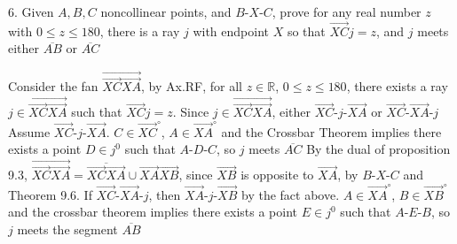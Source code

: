 \documentclass{report}
\begin{document}
    \bigbreak \noindent 
    \begin{mdframed}
        6. Given $A,B,C$ noncollinear points, and $ B\text{-}X\text{-}C$, prove for any real number $z$ with $0 \leq z \leq 180$, there is a ray $j$ with endpoint $X$ so that $\overrightarrow{XC}j  = z$, and $j$ meets either $\overline{AB}$  or $\overline{AC}$
    \end{mdframed}
    \bigbreak \noindent 
    Consider the fan $\overrightarrow{\overrightarrow{XC}\overrightarrow{XA}}$, by Ax.RF, for all $z \in \mathbb{R}$, $ 0 \leq z \leq 180$, there exists a ray $j  \in \overrightarrow{\overrightarrow{XC}\overrightarrow{XA}}$ such that $\overrightarrow{XC}j = z$. Since $ j \in \overrightarrow{\overrightarrow{XC}\overrightarrow{XA}}$, either $ \overrightarrow{XC}\text{-}j\text{-}\overrightarrow{XA}$ or $ \overrightarrow{XC}\text{-}\overrightarrow{XA}\text{-}j$
    \bigbreak \noindent 
    Assume $ \overrightarrow{XC}\text{-}j\text{-}\overrightarrow{XA}$. $C \in \overrightarrow{XC}^{\circ}$, $ A \in \overrightarrow{XA}^{\circ}$ and the Crossbar Theorem implies there exists a point $D \in j^{0}$ such that $ A\text{-}D\text{-}C$, so $ j$ meets $\overline{AC}$
    \bigbreak \noindent 
    By the dual of proposition 9.3, $\overrightarrow{\overrightarrow{XC}\overrightarrow{XA}} = \overline{\overrightarrow{XC}\overrightarrow{XA}} \cup \overrightarrow{XA}\overrightarrow{XB}$, since $ \overrightarrow{XB} $ is opposite to $\overrightarrow{XA}$, by $ B\text{-}X\text{-}C $ and Theorem 9.6.
    \bigbreak \noindent 
    If $ \overrightarrow{XC}\text{-}\overrightarrow{XA}\text{-}j$, then $ \overrightarrow{XA}\text{-}j\text{-}\overrightarrow{XB}$ by the fact above. $ A \in \overrightarrow{XA}^{\circ}$, $ B \in \overrightarrow{XB}^{\circ} $ and the crossbar theorem implies there exists a point $E \in j^{0}$ such that $ A\text{-}E\text{-}B$, so $j$ meets the segment $\overline{AB} $
\end{document}
